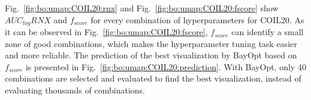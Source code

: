


Fig.~\ref{fig:bo:umap:COIL20:rnx} and Fig.~\ref{fig:bo:umap:COIL20:fscore} show $AUC_{log}RNX$ and $f_{score}$ for every combination of hyperparameters for COIL20.
As it can be observed in Fig.~\ref{fig:bo:umap:COIL20:fscore}, $f_{score}$ can identify a small zone of good combinations, which makes the hyperparameter tuning task easier and more reliable. The prediction of the best visualization by BayOpt based on $f_{score}$ is presented in Fig.~\ref{fig:bo:umap:COIL20:prediction}.
With BayOpt, only 40 combinations are selected and evaluated to find the best visualization, instead of evaluating thousands of combinations.


